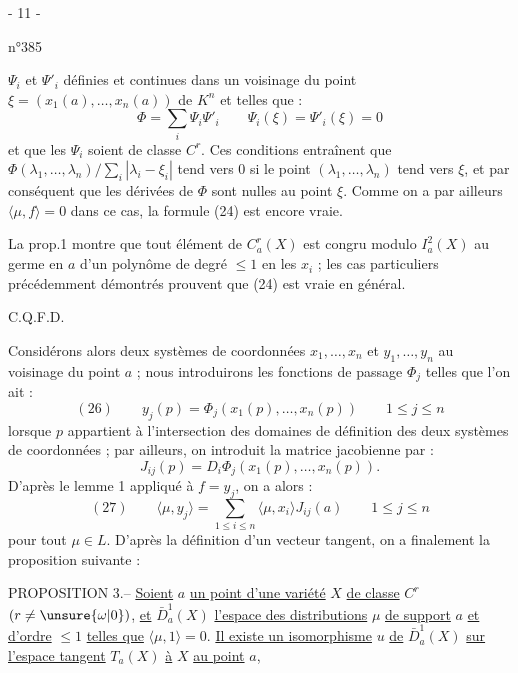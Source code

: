 \begin{center}- 11 -\end{center}
\begin{flushright}n°385\end{flushright}
$\Psi_i$ et $\Psi'_i$ définies et continues dans un voisinage du point $\xi=(x_1(a),\ldots,x_n(a))$ de $K^n$ et telles que :
\[
\Phi=\sum_i\Psi_i\Psi'_i
\qquad \Psi_i(\xi)=\Psi'_i(\xi)=0
\]
et que les $\Psi_i$ soient de classe $C^r$. Ces conditions entraînent que
$\Phi(\lambda_1,\ldots,\lambda_n)/\sum_i|\lambda_i-\xi_i|$ tend vers $0$ si le point $(\lambda_1,\ldots,\lambda_n)$ tend vers $\xi$, et par conséquent que les dérivées de $\Phi$ sont nulles au point $\xi$. Comme on a par ailleurs $\langle\mu,f\rangle=0$ dans ce cas, la formule (24) est encore vraie.

La prop.1 montre que tout élément de $C_a^r(X)$ est congru modulo $I_a^2(X)$ au germe en $a$ d'un polynôme de degré $\leq1$ en les $x_i$ ; les cas particuliers précédemment démontrés prouvent que (24) est vraie en général.
\begin{flushright}C.Q.F.D.\end{flushright}

Considérons alors deux systèmes de coordonnées $x_1,\ldots,x_n$ et $y_1,\ldots,y_n$ au voisinage du point $a$ ; nous introduirons les fonctions de passage $\Phi_j$ telles que l'on ait :
\[
(26)\qquad y_j(p)=\Phi_j(x_1(p),\ldots,x_n(p))
\qquad 1\leq j\leq n
\]
lorsque $p$ appartient à l'intersection des domaines de définition des deux systèmes de coordonnées ; par ailleurs, on introduit la matrice jacobienne par :
\[
J_{ij}(p)=D_i\Phi_j(x_1(p),\ldots,x_n(p)).
\]
D'après le lemme 1 appliqué à $f=y_j$, on a alors :
\[
(27)\qquad
\langle\mu,y_j\rangle=\sum_{1\leq i\leq n}\langle\mu,x_i\rangle J_{ij}(a)
\qquad 1\leq j\leq n
\]
pour tout $\mu\in L$. D'après la définition d'un vecteur tangent, on a finalement la proposition suivante :

PROPOSITION 3.-- \uline{Soient} $a$ \uline{un point d'une variété} $X$ \uline{de classe} $C^r$ $(r\neq\unsure{\omega|0})$, \uline{et} $\bar D_a^1(X)$ \uline{l'espace des distributions} $\mu$ \uline{de support} $a$ \uline{et d'ordre} $\leq1$ \uline{telles que} $\langle\mu,1\rangle=0$.
\uline{Il existe un isomorphisme} $u$ \uline{de} $\bar D_a^1(X)$ \uline{sur l'espace tangent} $T_a(X)$ \uline{à} $X$ \uline{au point} $a$,
